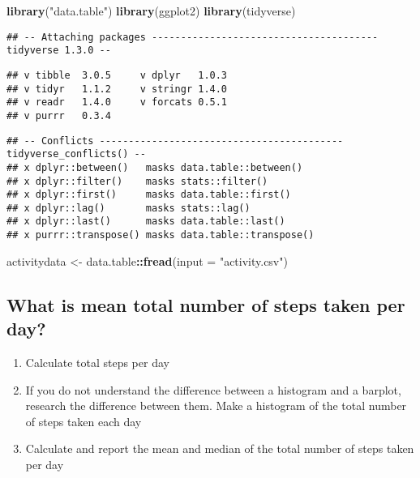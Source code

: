 \documentclass[
]{article}
\newenvironment{Shaded}{\begin{snugshade}}{\end{snugshade}}
\newcommand{\DataTypeTok}[1]{\textcolor[rgb]{0.13,0.29,0.53}{#1}}
\newcommand{\KeywordTok}[1]{\textcolor[rgb]{0.13,0.29,0.53}{\textbf{#1}}}
\newcommand{\NormalTok}[1]{#1}
\newcommand{\OperatorTok}[1]{\textcolor[rgb]{0.81,0.36,0.00}{\textbf{#1}}}
\newcommand{\StringTok}[1]{\textcolor[rgb]{0.31,0.60,0.02}{#1}}
\providecommand{\tightlist}{%
  \setlength{\itemsep}{0pt}\setlength{\parskip}{0pt}}
\begin{document}
\begin{Shaded}
\begin{Highlighting}[]
\KeywordTok{library}\NormalTok{(}\StringTok{"data.table"}\NormalTok{)}
\KeywordTok{library}\NormalTok{(ggplot2)}
\KeywordTok{library}\NormalTok{(tidyverse)}
\end{Highlighting}
\end{Shaded}

\begin{verbatim}
## -- Attaching packages --------------------------------------- tidyverse 1.3.0 --
\end{verbatim}

\begin{verbatim}
## v tibble  3.0.5     v dplyr   1.0.3
## v tidyr   1.1.2     v stringr 1.4.0
## v readr   1.4.0     v forcats 0.5.1
## v purrr   0.3.4
\end{verbatim}

\begin{verbatim}
## -- Conflicts ------------------------------------------ tidyverse_conflicts() --
## x dplyr::between()   masks data.table::between()
## x dplyr::filter()    masks stats::filter()
## x dplyr::first()     masks data.table::first()
## x dplyr::lag()       masks stats::lag()
## x dplyr::last()      masks data.table::last()
## x purrr::transpose() masks data.table::transpose()
\end{verbatim}

\begin{Shaded}
\begin{Highlighting}[]
\NormalTok{activitydata <-}\StringTok{ }\NormalTok{data.table}\OperatorTok{::}\KeywordTok{fread}\NormalTok{(}\DataTypeTok{input =} \StringTok{"activity.csv"}\NormalTok{)}
\end{Highlighting}
\end{Shaded}

\hypertarget{what-is-mean-total-number-of-steps-taken-per-day}{%
\subsection{What is mean total number of steps taken per
day?}\label{what-is-mean-total-number-of-steps-taken-per-day}}

\begin{enumerate}
\def\labelenumi{\arabic{enumi}.}
\tightlist
\item
  Calculate total steps per day
\item
  If you do not understand the difference between a histogram and a
  barplot, research the difference between them. Make a histogram of the
  total number of steps taken each day
\item
  Calculate and report the mean and median of the total number of steps
  taken per day
\end{enumerate}
\end{document}
